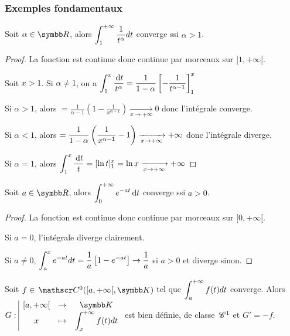 \subsubsection{Exemples fondamentaux }

\begin{proposition}{}{}
    Soit $\alpha \in \R$, alors $\displaystyle \int_{1 }^{+ \infty   } \frac{1}{t^\alpha} dt$ converge
    ssi $\alpha > 1$. 
\end{proposition}

\begin{proof}
    La fonction est continue donc continue par morceaux sur $[1, + \infty[$.

    Soit $x > 1$. Si $\alpha \neq 1$, on a $\displaystyle \int_{1 }^{x } \frac {\,\mathrm{d}t} {t^\alpha} = \frac{1}{1 - \alpha} \left[ - \frac{1}{t^{\alpha - 1}} \right]^x_1$


    \avspace Si $\alpha > 1$, alors $= \frac{1}{\alpha - 1} \left( 1 - \frac{1}{x^{\alpha - 1}} \right) \xrightarrow[x \to + \infty   ]{} 0$
    donc l'intégrale converge. 
    
    \avspace Si $\alpha < 1$, alors $= \displaystyle \frac{1 }{ 1 - \alpha } \left( \frac{1}{x^{\alpha - 1}} - 1 \right) \xrightarrow[x \to + \infty   ]{} + \infty$
    donc l'intégrale diverge.

    \avspace Si $\alpha = 1$, alors $\displaystyle \int_{1 }^{x } \frac {\,\mathrm{d}t} t = [\ln t]^x_1 = \ln x \xrightarrow[x \to + \infty   ]{} + \infty$
\end{proof}

\begin{proposition}{}{}
    Soit $a \in \R$, alors $\displaystyle \int_{0 }^{ + \infty   } e^{-at} \,\mathrm{d}t$ converge ssi $a > 0$.
\end{proposition}

\begin{proof}
    La fonction est continue donc continue par morceaux sur $[0, + \infty[$.

    Si $a = 0$, l'intégrale diverge clairement.

    Si $a \neq 0$, $\displaystyle \int_a^x e^{-at} dt = \frac 1 a \left[ 1 - e^{-at} \right] \to \frac 1 a$ si $a > 0$ et diverge sinon.
\end{proof}



\begin{definition}{}{}
    Soit $f \in \mc 0 ([a, + \infty[, \K)$ tel que $\displaystyle \int_a^{+ \infty} f(t) dt$ converge.
    Alors $\fonction G {[a, + \infty[}{\K}{x}{\int_x^{+ \infty} f(t) dt}$ est bien définie, de 
    classe $\,\mathscr C^{1}$ et $G' = -f$. 
\end{definition}

